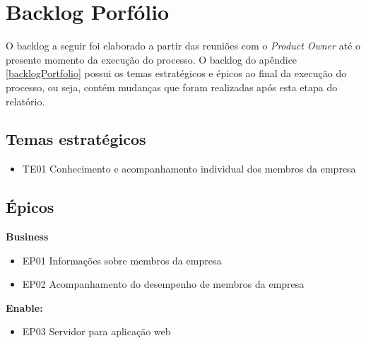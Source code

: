 \section{Backlog Porfólio}
O backlog a seguir foi elaborado a partir das reuniões com o \textit{Product Owner} até o presente momento da execução do processo. O backlog do apêndice \ref{backlogPortfolio} possui os temas estratégicos e épicos ao final da execução do processo, ou seja, contém mudanças que foram realizadas após esta etapa do relatório.


\subsection{Temas estratégicos}
\begin{itemize}
\item {TE01 Conhecimento e acompanhamento individual dos membros da empresa}
\end{itemize}

\subsection{Épicos}
\textbf{Business}
\begin{itemize}
\item {EP01 Informações sobre membros da empresa}
\item {EP02 Acompanhamento do desempenho de membros da empresa}
\end{itemize}

\textbf{Enable:}
\begin{itemize}
\item {EP03 Servidor para aplicação web}
\end{itemize}
